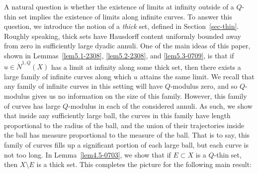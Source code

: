 \documentclass[10pt]{amsart}
\numberwithin{equation}{section}
\begin{document}
A natural question is whether the existence of limits at infinity outside of a $Q$-thin set implies the existence of limits along infinite curves.  To answer this question, we introduce the notion of a {\it thick} set, defined in Section~\ref{sec-thin}.  Roughly speaking, thick sets have Hausdorff content uniformly bounded away from zero in sufficiently large dyadic annuli.  One of the main ideas of this paper, shown in  Lemmas~\ref{lem5.1-2308}, \ref{lem5.2-2308}, and \ref{lem5.3-0709}, is that if $u\in\dot N^{1,Q}(X)$ has a limit at infinity along some thick set, then there exists a large family of infinite curves along which $u$ attains the same limit.  We recall that any family of infinite curves in this setting will have $Q$-modulus zero, and so $Q$-modulus gives us no information on the size of this family.  However, this family of curves has large $Q$-modulus in each of the considered annuli.  As such, we show that inside any sufficiently large ball, the curves in this family have length proportional to the radius of the ball, and the union of their trajectories inside the ball has measure proportional to the measure of the ball.  That is to say, this family of curves fills up a significant portion of each large ball, but each curve is not too long. In Lemma~\ref{lem4.5-0703}, we show that if $E\subset X$ is a $Q$-thin set, then $X\setminus E$ is a thick set.  This completes the picture for the following main result:
\end{document}
